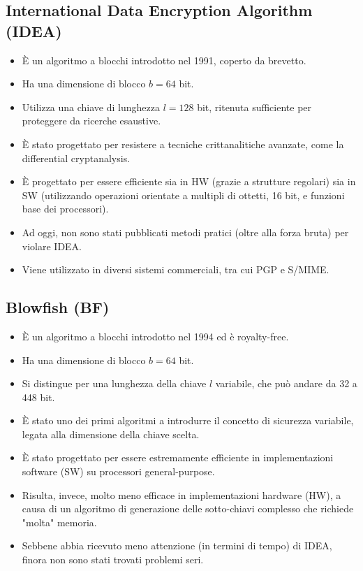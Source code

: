 \documentclass[../main.tex]{subfiles}
\begin{document}
\subsection{International Data Encryption Algorithm (IDEA)}
\begin{itemize}
	\item È un algoritmo a blocchi introdotto nel 1991, coperto da brevetto.
	\item Ha una dimensione di blocco $b=64$ bit.
	\item Utilizza una chiave di lunghezza $l=128$ bit, ritenuta sufficiente per proteggere da ricerche esaustive.
	\item È stato progettato per resistere a tecniche crittanalitiche avanzate, come la differential cryptanalysis.
	\item È progettato per essere efficiente sia in HW (grazie a strutture regolari) sia in SW (utilizzando operazioni orientate a multipli di ottetti, 16 bit, e funzioni base dei processori).
	\item Ad oggi, non sono stati pubblicati metodi pratici (oltre alla forza bruta) per violare IDEA.
	\item Viene utilizzato in diversi sistemi commerciali, tra cui PGP e S/MIME.
\end{itemize}

\subsection{Blowfish (BF)}
\begin{itemize}
	\item È un algoritmo a blocchi introdotto nel 1994 ed è royalty-free.
	\item Ha una dimensione di blocco $b=64$ bit.
	\item Si distingue per una lunghezza della chiave $l$ variabile, che può andare da 32 a 448 bit.
	\item È stato uno dei primi algoritmi a introdurre il concetto di sicurezza variabile, legata alla dimensione della chiave scelta.
	\item È stato progettato per essere estremamente efficiente in implementazioni software (SW) su processori general-purpose.
	\item Risulta, invece, molto meno efficace in implementazioni hardware (HW), a causa di un algoritmo di generazione delle sotto-chiavi complesso che richiede "molta" memoria.
	\item Sebbene abbia ricevuto meno attenzione (in termini di tempo) di IDEA, finora non sono stati trovati problemi seri.
\end{itemize}
\end{document}

